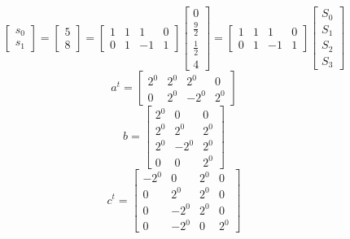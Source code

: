 \documentclass{article}%
\begin{document}
\[%
\left[\begin{matrix}s_{0}\\s_{1}\end{matrix}\right] = \left[\begin{matrix}5\\8\end{matrix}\right] = \left[\begin{matrix}1 & 1 & 1 & 0\\0 & 1 & -1 & 1\end{matrix}\right] \left[\begin{matrix}0\\\frac{9}{2}\\\frac{1}{2}\\4\end{matrix}\right] = \left[\begin{matrix}1 & 1 & 1 & 0\\0 & 1 & -1 & 1\end{matrix}\right] \left[\begin{matrix}S_{0}\\S_{1}\\S_{2}\\S_{3}\end{matrix}\right]%
\]%
\[%
a^{t} = \left[\begin{matrix}2^{0} & 2^{0} & 2^{0} & 0\\0 & 2^{0} & - 2^{0} & 2^{0}\end{matrix}\right]%
\]%
\[%
b = \left[\begin{matrix}2^{0} & 0 & 0\\2^{0} & 2^{0} & 2^{0}\\2^{0} & - 2^{0} & 2^{0}\\0 & 0 & 2^{0}\end{matrix}\right]%
\]%
\[%
c^{t} = \left[\begin{matrix}- 2^{0} & 0 & 2^{0} & 0\\0 & 2^{0} & 2^{0} & 0\\0 & - 2^{0} & 2^{0} & 0\\0 & - 2^{0} & 0 & 2^{0}\end{matrix}\right]%
\]%
\end{document}
